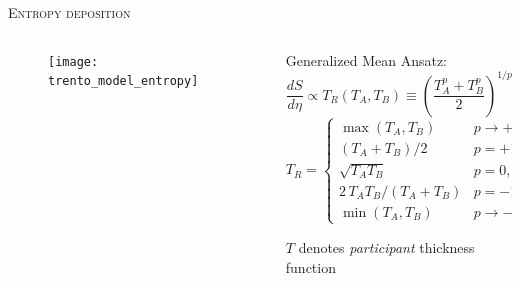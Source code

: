 \documentclass[aspectratio=169]{beamer}
\begin{document}
\begin{frame}[t]{\scshape Entropy deposition}
  \begin{columns}[T]
    \begin{column}{.5\textwidth}
      \begin{figure}
        \texttt{[image: trento\_model\_entropy]}
      \end{figure}
    \end{column}
    \begin{column}{.5\textwidth}
      \bigskip \centering
      \textcolor{theme}{Generalized Mean Ansatz:}
      \begin{equation*}
        \frac{dS}{d\eta} \propto T_R(T_A, T_B) \equiv
        \left(\frac{T_A^p + T_B^p}{2}\right)^{1/p}
      \end{equation*}
      \begin{equation*}
        T_R =
        \begin{cases}
          \max(T_A, T_B) & p \rightarrow +\infty, \\[.5ex]
          (T_A + T_B)/2 & p = +1, \\[.5ex]
          \sqrt{T_A T_B} & p = 0, \\[.5ex]
          2\, T_A T_B/(T_A + T_B) & p = -1, \\[.5ex]
          \min(T_A, T_B) & p \rightarrow -\infty.
        \end{cases}
      \end{equation*}
      \smallskip
      \begin{center}
        \small $T$ denotes \emph{participant} thickness function
      \end{center}
    \end{column}
  \end{columns}
\end{frame}
\end{document}
